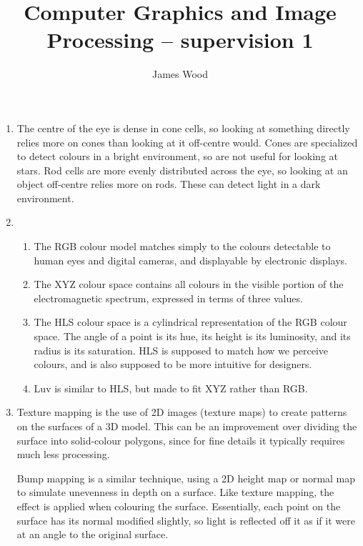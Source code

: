 \documentclass{article}
\begin{document}
\title{Computer Graphics and Image Processing -- supervision 1}
\author{James Wood}
\maketitle

\begin{enumerate}
  \item The centre of the eye is dense in cone cells, so looking at something directly relies more on cones than looking at it off-centre would. Cones are specialized to detect colours in a bright environment, so are not useful for looking at stars. Rod cells are more evenly distributed across the eye, so looking at an object off-centre relies more on rods. These can detect light in a dark environment.
  \item
    \begin{enumerate}
      \item The RGB colour model matches simply to the colours detectable to human eyes and digital cameras, and displayable by electronic displays.
      \item The XYZ colour space contains all colours in the visible portion of the electromagnetic spectrum, expressed in terms of three values.
      \item The HLS colour space is a cylindrical representation of the RGB colour space. The angle of a point is its hue, its height is its luminosity, and its radius is its saturation. HLS is supposed to match how we perceive colours, and is also supposed to be more intuitive for designers.
      \item Luv is similar to HLS, but made to fit XYZ rather than RGB.
    \end{enumerate}
  \item Texture mapping is the use of 2D images (texture maps) to create patterns on the surfaces of a 3D model. This can be an improvement over dividing the surface into solid-colour polygons, since for fine details it typically requires much less processing.

    Bump mapping is a similar technique, using a 2D height map or normal map to simulate unevenness in depth on a surface. Like texture mapping, the effect is applied when colouring the surface. Essentially, each point on the surface has its normal modified slightly, so light is reflected off it as if it were at an angle to the original surface.


\end{enumerate}
\end{document}
